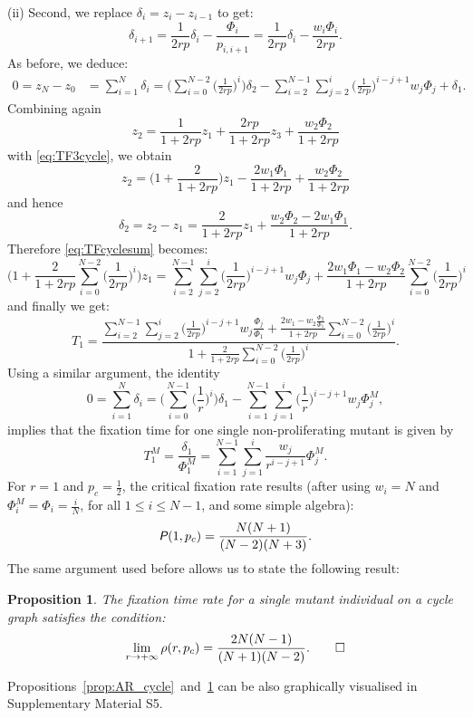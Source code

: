 \documentclass[a4paper,english,10pt]{amsart}
\newcommand{\Rho}{\emph{\textsf{P\hspace{0.1ex}}}}
\newtheorem{proposition}{\bf Proposition}[section]
\theoremstyle{definition}
\numberwithin{equation}{section}
\begin{document}
\noindent
(ii) Second, we replace $\delta_i = z_i - z_{i-1}$ to get:
\begin{equation}
  \label{eq:TFsimplecycle2}
  \delta_{i+1} = \frac{1}{2rp}\delta_i - \frac{\Phi_i}{p_{i,i+1}} 
  = \frac{1}{2rp}\delta_i - \frac{w_i\Phi_i}{2rp}.
\end{equation}
As before, we deduce: 
\begin{align} \label{eq:TFcyclesum}
0 = z_N - z_0  & = \sum_{i=1}^N \delta_i  = \Big( \sum_{i=0}^{N-2} \big(\frac{1}{2rp}\big)^i \Big) \delta_2  -  \sum_{i=2}^{N-1} \sum_{j=2}^i \big(\frac{1}{2rp}\big)^{i-j+1}w_j\Phi_j+ \delta_1.
\end{align} 
Combining again 
$$
z_2 = \frac{1}{1+2rp} z_1 + \frac{2rp}{1+2rp} z_3 + \frac{w_2\Phi_2}{1+2rp} 
$$
with \eqref{eq:TF3cycle}, we obtain 
$$
z_2 = \big(1+ \frac{2}{1+2rp} \big) z_1 - 
 \frac{2w_1\Phi_1}{1+2rp} + \frac{w_2\Phi_2}{1+2rp} 
$$
and hence 
$$
\delta_ 2 = z_2 - z_1 =\frac{2}{1+2rp} z_1 + \frac{w_2\Phi_2- 2w_1\Phi_1}{1+2rp}.
$$
Therefore \eqref{eq:TFcyclesum} becomes:
\begin{equation} \label{eq:ATfinalcycle}
 \Big(1 + \frac{2}{1+2rp}  \sum_{i=0}^{N-2} \big(\frac{1}{2rp}\big)^i \Big) z_1 
=  \sum_{i=2}^{N-1} \sum_{j=2}^i \big(\frac{1}{2rp}\big)^{i-j+1}w_j\Phi_j  
+ \frac{2w_1\Phi_1 - w_2\Phi_2 }{1+2rp} \sum_{i=0}^{N-2} \big(\frac{1}{2rp}\big)^i  
\end{equation}
and finally we get: 
\begin{equation} \label{eq:TFCycle}
 T_1 =  \frac{\displaystyle \sum_{i=2}^{N-1} \sum_{j=2}^i \big(\frac{1}{2rp}\big)^{i-j+1}w_j\frac{\Phi_j}{\Phi_1} + \frac{ 2w_1 - w_2\frac{\Phi_2}{\Phi_1}}{1+2rp} \sum_{i=0}^{N-2} \big(\frac{1}{2rp}\big)^i}{\displaystyle  1 + \frac{2}{1+2rp}  \sum_{i=0}^{N-2} \big(\frac{1}{2rp}\big)^i }.
\end{equation}
Using a similar argument, the identity
\begin{equation*}
0   = \sum_{i=1}^N \delta_i  = \Big( \sum_{i=0}^{N-1} \big(\frac{1}{r}\big)^i \Big) \delta_1  -  \sum_{i=1}^{N-1} \sum_{j=1}^i \big(\frac{1}{r}\big)^{i-j+1}w_j\Phi^M_j, 
\end{equation*} 
implies that the fixation time for one single non-proliferating mutant is given by
\begin{equation} \label{eq:TFMorancycle}
 T_1^M    =  \frac{\delta _1}{\Phi^M_1} = 
 \sum_{i=1}^{N-1} \sum_{j=1}^i \frac{w_j}{r^{i-j+1}} \Phi^M_j.
\end{equation}
For $r=1$ and $p_c = \frac{1}{2}$, the critical fixation rate results (after using $w_i=N$ and $\Phi^M_i=\Phi_i = \frac{i}{N}$, for all $1 \leq i \leq N-1$, and some simple algebra):
\[
\Rho(1,p_c) = \frac{N(N+1)}{(N-2)(N+3)}.
\]
The same argument used before allows us to state the following result: 
\begin{proposition} \label{prop:FR_cycle}
The fixation time rate for a single mutant individual on a cycle graph satisfies the condition:
$$
\lim_{r \to +\infty} \rho(r,p_c)  = \frac{2N(N-1)}{(N+1)(N-2)}. \qedhere
$$
\end{proposition}
\noindent
Propositions~\ref{prop:AR_cycle}~and~\ref{prop:FR_cycle} can be also graphically visualised in Supplementary Material S5. 
\end{document}
